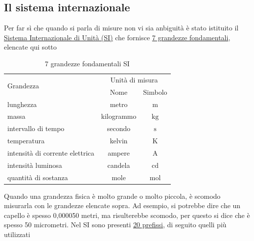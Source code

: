 \subsection{Il sistema internazionale}
Per far sì che quando si parla di misure non vi sia anbiguità è stato istituito il \underline{Sistema Internazionale  di Unità (SI)} che fornisce \underline{7 grandezze fondamentali}, elencate qui sotto
\begin{table}[H]
	\begin{center}
		\begin{tabular}{lcc}
			\toprule
			\multirow{2}{*}{ Grandezza }    & \multicolumn{2}{c}{ Unità di misura }                  \\
			                                & Nome                                  & Simbolo        \\
			\midrule

			lunghezza                       & metro                                 & $\mathrm{m}$   \\
			massa                           & kilogrammo                            & $\mathrm{kg}$  \\
			intervallo di tempo             & secondo                               & $\mathrm{s}$   \\
			temperatura                     & kelvin                                & $\mathrm{K}$   \\
			intensità di corrente elettrica & ampere                                & $\mathrm{A}$   \\
			intensità luminosa              & candela                               & $\mathrm{cd}$  \\
			quantità di sostanza            & mole                                  & $\mathrm{mol}$ \\
			\bottomrule
		\end{tabular}
	\end{center}
	\caption{7 grandezze fondamentali SI}
	\label{unitSI}
\end{table}
\vskip3mm
Quando una grandezza fisica è molto grande o molto piccola, è scomodo misurarla con le grandezze elencate sopra. Ad esempio, si potrebbe dire che un capello è spesso 0,000050 metri, ma risulterebbe scomodo, per questo si dice che è spesso 50 micrometri. Nel SI sono presenti \underline{20 prefissi}, di seguito quelli più utilizzati
\vskip3mm
